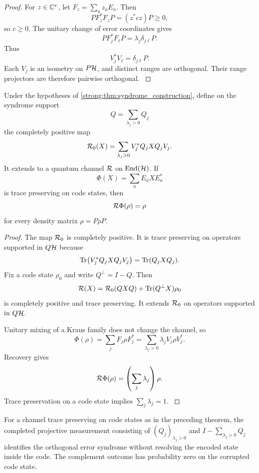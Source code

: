 \begin{proof}\label{strong:proof:040}
For \(z\in\CC^r\), let \(F_z=\sum_az_aE_a\). Then
\[
PF_z^*F_zP=(z^*cz)P\geq0,
\]
so \(c\geq0\). The unitary change of error coordinates gives
\[
PF_j^*F_\ell P
=
\lambda_j\delta_{j\ell}P.
\]
Thus
\[
V_j^*V_\ell=\delta_{j\ell}P.
\]
Each \(V_j\) is an isometry on \(P\Hcal\), and distinct ranges are orthogonal. Their range projectors are therefore pairwise orthogonal.
\label{strong:proof:040:end}\end{proof}

\begin{theorem}\label{strong:theorem:028}\label{strong:thm:exact_recovery}
Under the hypotheses of \cref{strong:thm:syndrome_construction}, define on the syndrome support
\[
Q=\sum_{\lambda_j>0}Q_j
\]
the completely positive map
\[
\Rcal_0(X)
=
\sum_{\lambda_j>0}
V_j^*Q_jXQ_jV_j.
\]
It extends to a quantum channel \(\Rcal\) on \(\End(\Hcal)\). If
\[
\Phi(X)=\sum_aE_aXE_a^*
\]
is trace preserving on code states, then
\[
\Rcal\Phi(\rho)=\rho
\]
for every density matrix \(\rho=P\rho P\).
\end{theorem}

\begin{proof}\label{strong:proof:041}
The map \(\Rcal_0\) is completely positive. It is trace preserving on operators supported in \(Q\Hcal\) because
\[
\operatorname{Tr}\bigl(V_j^*Q_jXQ_jV_j\bigr)
=
\operatorname{Tr}(Q_jXQ_j).
\]
Fix a code state \(\rho_0\) and write \(Q^\perp=I-Q\). Then
\[
\Rcal(X)
=
\Rcal_0(QXQ)
+
\Tr(Q^\perp X)\rho_0
\]
is completely positive and trace preserving. It extends \(\Rcal_0\) on operators supported in \(Q\Hcal\).

Unitary mixing of a Kraus family does not change the channel, so
\[
\Phi(\rho)
=
\sum_jF_j\rho F_j^*
=
\sum_{\lambda_j>0}
\lambda_jV_j\rho V_j^*.
\]
Recovery gives
\[
\Rcal\Phi(\rho)
=
\left(\sum_j\lambda_j\right)\rho.
\]
Trace preservation on a code state implies \(\sum_j\lambda_j=1\).
\label{strong:proof:041:end}\end{proof}

\begin{corollary}\label{strong:corollary:011}\label{strong:cor:syndrome_preserves_logic}
For a channel trace preserving on code states as in the preceding theorem, the completed projective measurement consisting of \((Q_j)_{\lambda_j>0}\) and \(I-\sum_{\lambda_j>0}Q_j\) identifies the orthogonal error syndrome without resolving the encoded state inside the code. The complement outcome has probability zero on the corrupted code state.
\end{corollary}

